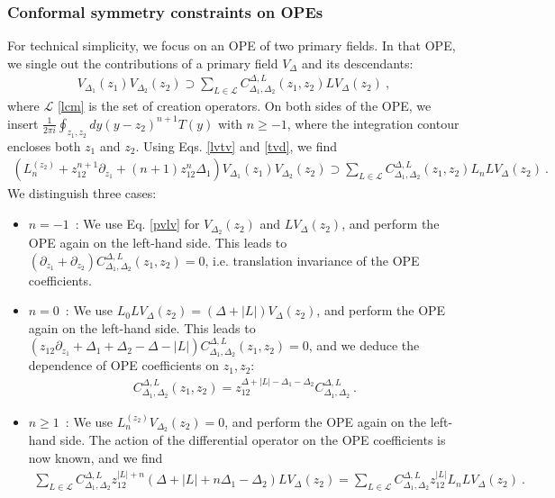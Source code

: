 \documentclass[12pt, a4paper]{article}
\theoremstyle{break}
\begin{document}
\subsubsection{Conformal symmetry constraints on OPEs}\label{sec:csope}

For technical simplicity, we focus on an OPE of two primary fields. In that OPE, we single out the contributions of a primary field $V_\Delta$ and its descendants:
\begin{align}
 V_{\Delta_1}(z_1)V_{\Delta_2}(z_2) \supset \sum_{L\in \mathcal{L}} C_{\Delta_1,\Delta_2}^{\Delta, L}(z_1,z_2) LV_\Delta(z_2) \ ,
\end{align}
where $\mathcal{L}$ \eqref{lcm} is the set of creation operators. On both sides of the OPE, we insert $\frac{1}{2\pi i}\oint_{z_1,z_2} dy (y-z_2)^{n+1}T(y)$ with $n\geq -1$, where the integration contour encloses both $z_1$ and $z_2$. Using Eqs. \eqref{lvtv} and \eqref{tvd}, we find
\begin{align}
 \left(L_n^{(z_2)} +z_{12}^{n+1}\partial_{z_1} + (n+1)z_{12}^n\Delta_1\right) V_{\Delta_1}(z_1)V_{\Delta_2}(z_2) \supset \sum_{L\in \mathcal{L}} C_{\Delta_1,\Delta_2}^{\Delta, L}(z_1,z_2)L_nLV_\Delta(z_2) \ .
\end{align}
We distinguish three cases:
\begin{itemize}
 \item $\boxed{n=-1}$\ : We use Eq. \eqref{pvlv} for $V_{\Delta_2}(z_2)$ and $LV_{\Delta}(z_2)$, and perform the OPE again on the left-hand side. This leads to $(\partial_{z_1}+\partial_{z_2})C^{\Delta,L}_{\Delta_1,\Delta_2}(z_1,z_2)=0$, i.e. translation invariance of the OPE coefficients.
 \item $\boxed{n=0}$\ : We use $L_0LV_{\Delta}(z_2)= (\Delta+|L|) V_{\Delta}(z_2)$, and perform the OPE again on the left-hand side. This leads to $(z_{12}\partial_{z_1}+\Delta_1+\Delta_2-\Delta-|L|)C^{\Delta,L}_{\Delta_1,\Delta_2}(z_1,z_2) = 0$, and we deduce the dependence of OPE coefficients on $z_1,z_2$:
 \begin{align}
  C^{\Delta,L}_{\Delta_1,\Delta_2}(z_1,z_2) = z_{12}^{\Delta+|L|-\Delta_1-\Delta_2} C^{\Delta,L}_{\Delta_1,\Delta_2}\ . 
 \end{align}
\item $\boxed{n\geq 1}$\ : We use $L_n^{(z_2)}V_{\Delta_2}(z_2)=0$, and perform the OPE again on the left-hand side. The action of the differential operator on the OPE coefficients is now known, and we find 
\begin{align}
 \sum_{L\in\mathcal{L}} C^{\Delta,L}_{\Delta_1,\Delta_2}z_{12}^{|L|+n}(\Delta+|L|+n\Delta_1-\Delta_2) LV_{\Delta}(z_2)= \sum_{L\in\mathcal{L}} C^{\Delta,L}_{\Delta_1,\Delta_2}z_{12}^{|L|}L_n LV_{\Delta}(z_2)\ .
\end{align}
\end{itemize}
\end{document}
